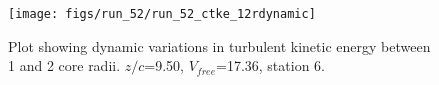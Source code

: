 \begin{figure}[H]
\centering
\texttt{[image: figs/run\_52/run\_52\_ctke\_12rdynamic]}
\caption{Plot showing dynamic variations in turbulent kinetic energy between 1 and 2 core radii. $z/c$=9.50, $V_{free}$=17.36, station 6.}
\label{fig:run_52_ctke_12rdynamic}
\end{figure}


